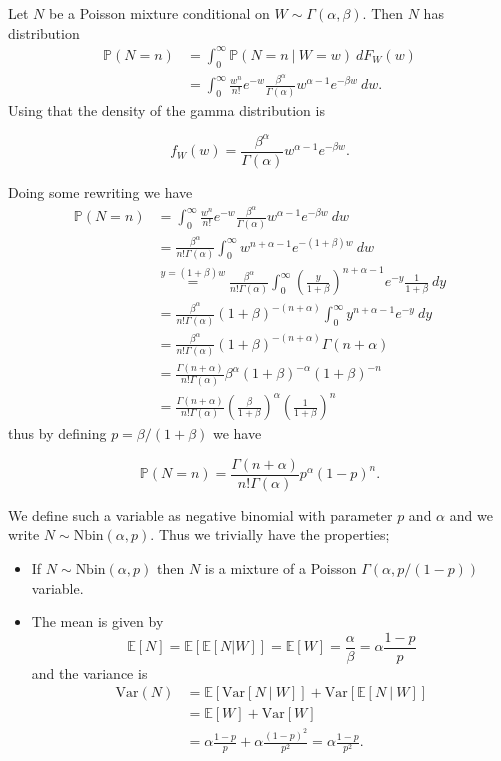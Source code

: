 \documentclass[a4paper,10pt,openany]{book}
\providecommand{\tightlist}{%
 \setlength{\itemsep}{0pt}\setlength{\parskip}{0pt}}
\begin{document}
Let \(N\) be a Poisson mixture conditional on \(W\sim \Gamma(\alpha,\beta)\). Then \(N\) has distribution
\begin{align*}
\mathbb P(N=n)&=\int_0^\infty \mathbb P(N=n\ \vert\ W=w)\ dF_W(w)\\
&=\int_0^\infty \frac{w^n}{n!}e^{-w} \frac{\beta^\alpha}{\Gamma(\alpha)}w^{\alpha -1}e^{-\beta w}\ dw.
\end{align*}
Using that the density of the gamma distribution is

\[
f_W(w)=\frac{\beta^\alpha}{\Gamma(\alpha)}w^{\alpha -1}e^{-\beta w}.
\]

Doing some rewriting we have
\begin{align*}
\mathbb P(N=n)&=\int_0^\infty \frac{w^n}{n!}e^{-w} \frac{\beta^\alpha}{\Gamma(\alpha)}w^{\alpha -1}e^{-\beta w}\ dw\\
&= \frac{\beta^\alpha}{n!\Gamma(\alpha)}\int_0^\infty w^{n+\alpha -1}e^{-(1+\beta) w}\ dw\\
&\stackrel{y=(1+\beta)w}{=} \frac{\beta^\alpha}{n!\Gamma(\alpha)}\int_0^\infty \left(\frac{y}{1+\beta}\right)^{n+\alpha -1}e^{-y}\frac{1}{1+\beta}\ dy\\
&=\frac{\beta^\alpha}{n!\Gamma(\alpha)}(1+\beta)^{-(n+\alpha)}\int_0^\infty y^{n+\alpha - 1}e^{-y}\ dy\\
&=\frac{\beta^\alpha}{n!\Gamma(\alpha)}(1+\beta)^{-(n+\alpha)}\Gamma(n+\alpha)\\
&=\frac{\Gamma(n+\alpha)}{n!\Gamma(\alpha)}\beta^\alpha (1+\beta)^{-\alpha}(1+\beta)^{-n}\\
&=\frac{\Gamma(n+\alpha)}{n!\Gamma(\alpha)} \left(\frac{\beta}{1+\beta}\right)^{\alpha}\left(\frac{1}{1+\beta}\right)^{n}
\end{align*}
thus by defining \(p=\beta/(1+\beta)\) we have

\[
\mathbb P(N=n)=\frac{\Gamma(n+\alpha)}{n!\Gamma(\alpha)} p^\alpha(1-p)^n.
\]

We define such a variable as negative binomial with parameter \(p\) and \(\alpha\) and we write \(N\sim \text{Nbin}(\alpha,p)\). Thus we trivially have the properties;

\begin{itemize}
\tightlist
\item
  If \(N\sim \text{Nbin}(\alpha,p)\) then \(N\) is a mixture of a Poisson \(\Gamma(\alpha, p/(1-p))\) variable.
\item
  The mean is given by
  \[\mathbb E[N]=\mathbb E[\mathbb E[N\vert W]]=\mathbb E[W]=\frac{\alpha}{\beta}=\alpha\frac{1-p}{p}\]
  and the variance is
  \begin{align*}
    \text{Var}(N)&=\mathbb E[\text{Var}[N\ \vert\ W]] + \text{Var}[\mathbb E[N\ \vert\ W]]\\
    &=\mathbb E[W]+\text{Var}[W]\\
    &=\alpha \frac{1-p}{p}+\alpha \frac{(1-p)^2}{p^2}=\alpha\frac{1-p}{p^2}.
    \end{align*}
\end{itemize}
\end{document}
